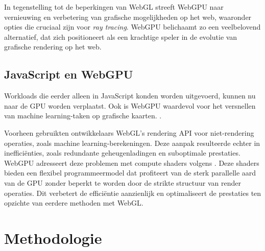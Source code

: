 \bigbreak{}
In tegenstelling tot de beperkingen van WebGL streeft WebGPU naar vernieuwing en verbetering van grafische mogelijkheden op het web, waaronder opties die cruciaal zijn voor \textit{ray tracing}. WebGPU belichaamt zo een veelbelovend alternatief, dat zich positioneert als een krachtige speler in de evolutie van grafische rendering op het web.

\subsection{JavaScript en WebGPU}

Workloads die eerder alleen in JavaScript konden worden uitgevoerd, kunnen nu naar de GPU worden verplaatst. Ook is WebGPU waardevol voor het versnellen van machine learning-taken op grafische kaarten. \autocite{Wallez2023}.

\bigbreak{}
Voorheen gebruikten ontwikkelaars WebGL's rendering API voor niet-\-ren\-de\-ring operaties, zoals machine learning-be\-re\-ke\-ning\-en. Deze aanpak resulteerde echter in inefficiënties, zoals redundante geheugenladingen en suboptimale prestaties. WebGPU adresseert deze problemen met compute shaders volgens \textcite{Beaufort2023}. Deze shaders bieden een flexibel programmeermodel dat profiteert van de sterk parallelle aard van de GPU zonder beperkt te worden door de strikte structuur van render operaties.  Dit verbetert de efficiëntie aanzienlijk en optimaliseert de prestaties ten  opzichte van eerdere methoden met WebGL.

\newpage


\section{Methodologie}%
\label{sec:methodologie}



